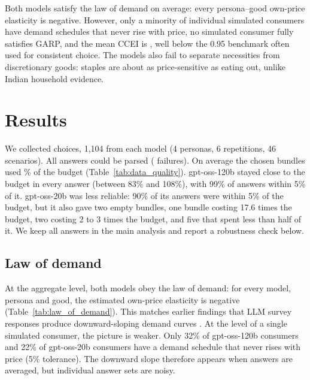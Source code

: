 Both models satisfy the law of demand on average: every persona--good own-price elasticity is negative. However, only a minority of individual simulated consumers have demand schedules that never rise with price, no simulated consumer fully satisfies GARP, and the mean CCEI is \MeanCCEI{}, well below the 0.95 benchmark often used for consistent choice. The models also fail to separate necessities from discretionary goods: staples are about as price-sensitive as eating out, unlike Indian household evidence.

\section{Results}
We collected \NCalls{} choices, 1{,}104 from each model (4 personas, 6 repetitions, 46 scenarios). All \NCalls{} answers could be parsed (\NFailed{} failures). On average the chosen bundles used \MeanBudgetUse\% of the budget (Table~\ref{tab:data_quality}). gpt-oss-120b stayed close to the budget in every answer (between 83\% and 108\%), with 99\% of answers within 5\% of it. gpt-oss-20b was less reliable: 90\% of its answers were within 5\% of the budget, but it also gave two empty bundles, one bundle costing 17.6 times the budget, two costing 2 to 3 times the budget, and five that spent less than half of it. We keep all answers in the main analysis and report a robustness check below.

\subsection{Law of demand}
At the aggregate level, both models obey the law of demand: for every model, persona and good, the estimated own-price elasticity is negative (Table~\ref{tab:law_of_demand}). This matches earlier findings that LLM survey responses produce downward-sloping demand curves \citep{brand2023}. At the level of a single simulated consumer, the picture is weaker. Only 32\% of gpt-oss-120b consumers and 22\% of gpt-oss-20b consumers have a demand schedule that never rises with price (5\% tolerance). The downward slope therefore appears when answers are averaged, but individual answer sets are noisy.

